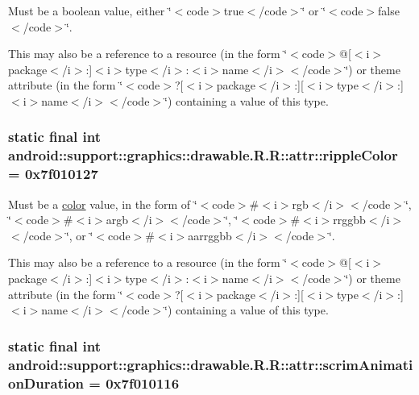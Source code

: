 Must be a boolean value, either \char`\"{}$<$code$>$true$<$/code$>$\char`\"{} or \char`\"{}$<$code$>$false$<$/code$>$\char`\"{}. 

This may also be a reference to a resource (in the form \char`\"{}$<$code$>$@\mbox{[}$<$i$>$package$<$/i$>$:\mbox{]}$<$i$>$type$<$/i$>$:$<$i$>$name$<$/i$>$$<$/code$>$\char`\"{}) or theme attribute (in the form \char`\"{}$<$code$>$?\mbox{[}$<$i$>$package$<$/i$>$:\mbox{]}\mbox{[}$<$i$>$type$<$/i$>$:\mbox{]}$<$i$>$name$<$/i$>$$<$/code$>$\char`\"{}) containing a value of this type. \hypertarget{classandroid_1_1support_1_1graphics_1_1drawable_1_1_r_1_1attr_89c88fb650ea7c2f1bd548af1a13b13d}{
\subsubsection[{rippleColor}]{\setlength{\rightskip}{0pt plus 5cm}static final int android::support::graphics::drawable.R.R::attr::rippleColor = 0x7f010127}}
\label{classandroid_1_1support_1_1graphics_1_1drawable_1_1_r_1_1attr_89c88fb650ea7c2f1bd548af1a13b13d}


Must be a \hyperlink{classandroid_1_1support_1_1graphics_1_1drawable_1_1_r_1_1color}{color} value, in the form of \char`\"{}$<$code$>$\#$<$i$>$rgb$<$/i$>$$<$/code$>$\char`\"{}, \char`\"{}$<$code$>$\#$<$i$>$argb$<$/i$>$$<$/code$>$\char`\"{}, \char`\"{}$<$code$>$\#$<$i$>$rrggbb$<$/i$>$$<$/code$>$\char`\"{}, or \char`\"{}$<$code$>$\#$<$i$>$aarrggbb$<$/i$>$$<$/code$>$\char`\"{}. 

This may also be a reference to a resource (in the form \char`\"{}$<$code$>$@\mbox{[}$<$i$>$package$<$/i$>$:\mbox{]}$<$i$>$type$<$/i$>$:$<$i$>$name$<$/i$>$$<$/code$>$\char`\"{}) or theme attribute (in the form \char`\"{}$<$code$>$?\mbox{[}$<$i$>$package$<$/i$>$:\mbox{]}\mbox{[}$<$i$>$type$<$/i$>$:\mbox{]}$<$i$>$name$<$/i$>$$<$/code$>$\char`\"{}) containing a value of this type. \hypertarget{classandroid_1_1support_1_1graphics_1_1drawable_1_1_r_1_1attr_d4b69ed7c88aacd7659e7c74b0439c9e}{
\subsubsection[{scrimAnimationDuration}]{\setlength{\rightskip}{0pt plus 5cm}static final int android::support::graphics::drawable.R.R::attr::scrimAnimationDuration = 0x7f010116}}
\label{classandroid_1_1support_1_1graphics_1_1drawable_1_1_r_1_1attr_d4b69ed7c88aacd7659e7c74b0439c9e}


